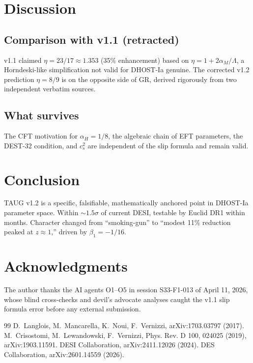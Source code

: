 \documentclass[aps,prd,twocolumn,floatfix,nofootinbib]{revtex4-2}
\begin{document}
\section{Discussion}
\subsection{Comparison with v1.1 (retracted)}
v1.1 claimed $\eta = 23/17 \approx 1.353$ (35\% enhancement) based on
$\eta = 1 + 2\alpha_M/\Lambda$, a Horndeski-like simplification not
valid for DHOST-Ia genuine. The corrected v1.2 prediction $\eta = 8/9$
is on the opposite side of GR, derived rigorously from two independent
verbatim sources.

\subsection{What survives}
The CFT motivation for $\alpha_H = 1/8$, the algebraic chain of EFT
parameters, the DEST-32 condition, and $c_s^2$ are independent of
the slip formula and remain valid.

\section{Conclusion}
TAUG v1.2 is a specific, falsifiable, mathematically anchored point
in DHOST-Ia parameter space. Within $\sim 1.5\sigma$ of current DESI,
testable by Euclid DR1 within months. Character changed from
``smoking-gun'' to ``modest 11\% reduction peaked at $z \approx 1$,''
driven by $\beta_1 = -1/16$.

\section*{Acknowledgments}
The author thanks the AI agents O1--O5 in session S33-F1-013 of
April 11, 2026, whose blind cross-checks and devil's advocate
analyses caught the v1.1 slip formula error before any external
submission.

\begin{thebibliography}{99}
D.~Langlois, M.~Mancarella, K.~Noui, F.~Vernizzi, arXiv:1703.03797 (2017).
M.~Crisostomi, M.~Lewandowski, F.~Vernizzi, Phys. Rev. D 100, 024025 (2019), arXiv:1903.11591.
DESI Collaboration, arXiv:2411.12026 (2024).
DES Collaboration, arXiv:2601.14559 (2026).
\end{thebibliography}
\end{document}
